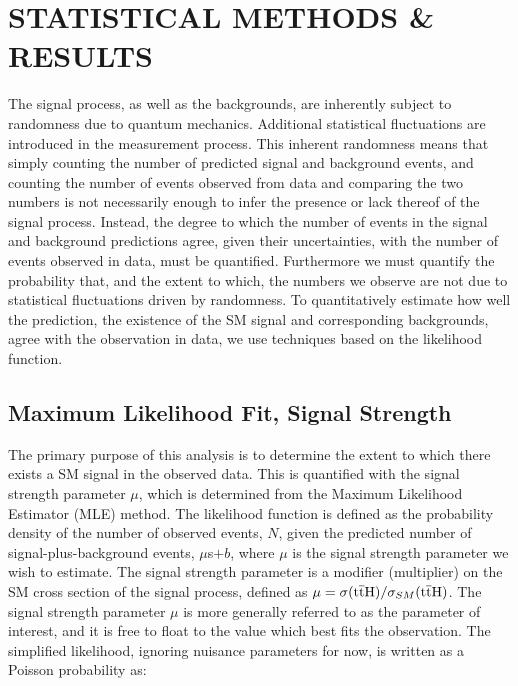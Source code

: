 %
%

\chapter{STATISTICAL METHODS & RESULTS}
\label{chap:stats}
The \tth signal process, as well as the backgrounds, are inherently subject to randomness due to quantum mechanics.
Additional statistical fluctuations are introduced in the measurement process. This inherent randomness means that simply counting the number of predicted
signal and background events, and counting the number of events observed from data and comparing the two numbers is not necessarily enough to infer the presence or
lack thereof of the \tth signal process. Instead, the degree to which the
number of events in the signal and background predictions agree, given their uncertainties, with the number of events observed in data, must be quantified.
Furthermore we must quantify the probability that, and the extent to which, the numbers we observe are not due to statistical fluctuations driven by randomness. 
To quantitatively estimate how well the prediction, the existence of the SM \tth signal and corresponding backgrounds, agree with the observation in data,
we use techniques based on the likelihood function.

\section{Maximum Likelihood Fit, Signal Strength}
\label{sec:fit}
The primary purpose of this analysis is to determine the extent to which there exists a SM \tth signal in the observed data. This is quantified with the signal strength
parameter $\mu$, which is determined from the Maximum Likelihood Estimator (MLE) method. 
The likelihood function is defined as the probability density of the number of observed events, $N$, given the predicted number of signal-plus-background events, $\mu$s$ + b$,
where $\mu$ is the signal strength parameter we wish to estimate.
The signal strength parameter is a modifier (multiplier) on the SM cross section of the \tth signal process, defined as $\mu = \sigma(\mathrm{t}\overline{\mathrm{t}}\mathrm{H})/\sigma_{SM}(\mathrm{t}\overline{\mathrm{t}}\mathrm{H})$.
The signal strength parameter $\mu$ is more generally referred to as the parameter of interest, and it is free to float to the value which best fits the observation.
The simplified likelihood, ignoring nuisance parameters for now, is written as a Poisson probability as:

